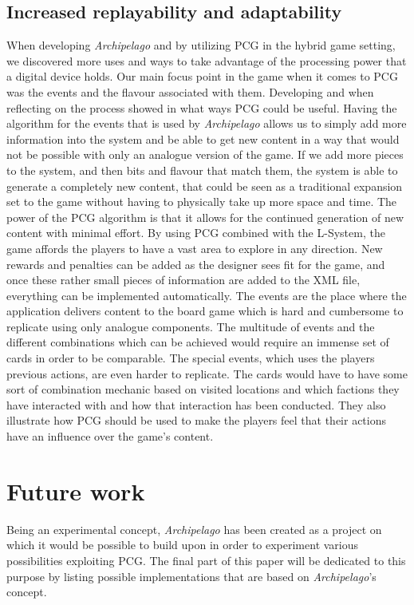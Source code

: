\subsection{Increased replayability and adaptability}
When developing \textit{Archipelago} and by utilizing PCG in the hybrid game setting, we discovered more uses and ways to take advantage of the processing power that a digital device holds. Our main focus point in the game when it comes to PCG was the events and the flavour associated with them. Developing and when reflecting on the process showed in what ways PCG could be useful. Having the algorithm for the events that is used by \textit{Archipelago} allows us to simply add more information into the system and be able to get new content in a way that would not be possible with only an analogue version of the game. If we add more pieces to the system, and then bits and flavour that match them, the system is able to generate a completely new content, that could be seen as a traditional expansion set to the game without having to physically take up more space and time. The power of the PCG algorithm is that it allows for the continued generation of new content with minimal effort. By using PCG combined with the L-System, the game affords the players to have a vast area to explore in any direction. New rewards and penalties can be added as the designer sees fit for the game, and once these rather small pieces of information are added to the XML file, everything can be implemented automatically. The events are the place where the application delivers content to the board game which is hard and cumbersome to replicate using only analogue components. The multitude of events and the different combinations which can be achieved would require an immense set of cards in order to be comparable. 
The special events, which uses the players previous actions, are even harder to replicate. The cards would have to have some sort of combination mechanic based on visited locations and which factions they have interacted with and how that interaction has been conducted. They also illustrate how PCG should be used to make the players feel that their actions have an influence over the game's content.

\section{Future work}
\label{sec:future}
Being an experimental concept, \textit{Archipelago} has been created as a project on which it would be possible to build upon in order to experiment various possibilities exploiting PCG. The final part of this paper will be dedicated to this purpose by listing possible implementations that are based on \textit{Archipelago}'s concept.

